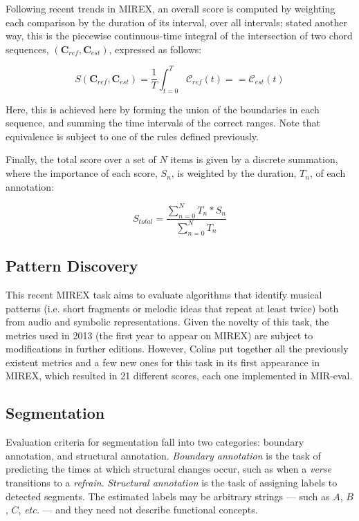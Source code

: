 \documentclass{article}
\def\etc{\emph{etc.\/}}
\begin{document}
Following recent trends in MIREX, an overall score is computed by weighting each comparison by the duration of its interval, over all intervals; stated another way, this is the piecewise continuous-time integral of the intersection of two chord sequences, $(\mathbf{C}_{ref}, \mathbf{C}_{est})$, expressed as follows:

\begin{equation}
S(\mathbf{C}_{ref}, \mathbf{C}_{est}) = \frac{1}{T}\int_{t=0}^{T} \mathcal{C}_{ref}(t) == \mathcal{C}_{est}(t)
\end{equation}

\noindent Here, this is achieved here by forming the union of the boundaries in each sequence, and summing the time intervals of the correct ranges. Note that equivalence is subject to one of the rules defined previously. 

Finally, the total score over a set of $N$ items is given by a discrete summation, where the importance of each score, $S_n$, is weighted by the duration, $T_n$, of each annotation:

\begin{equation}
S_{total} = \frac{\sum_{n=0}^{N} T_n*S_n}{\sum_{n=0}^{N} T_n}
\end{equation}
 
\subsection{Pattern Discovery}

This recent MIREX task aims to evaluate algorithms that identify musical patterns (i.e. short fragments or melodic ideas that repeat at least twice) both from audio and symbolic representations.
Given the novelty of this task, the metrics used in 2013 (the first year to appear on MIREX) are subject to modifications in further editions.
However, Colins\cite{TomColins2013} put together all the previously existent metrics and a few new ones for this task in its first appearance in MIREX, which resulted in 21 different scores, each one implemented in MIR-eval.

\subsection{Segmentation}

Evaluation criteria for segmentation fall into two categories: boundary annotation, and structural annotation.
\emph{Boundary annotation} is the task of predicting the times at which structural changes occur, such as when a \emph{verse} transitions to a \emph{refrain}.
\emph{Structural annotation} is the task of assigning labels to detected segments.  
The estimated labels may be arbitrary strings --- such as $A$, $B$, $C$, \etc{} --- and they need not describe functional concepts.
\end{document}
